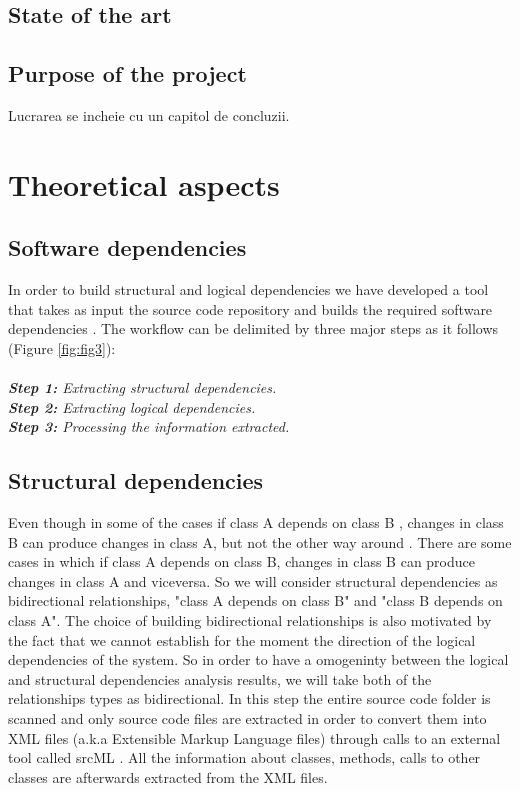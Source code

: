 \documentclass[12pt,a4paper,oneside]{report}
\begin{document}
\section {State of the art}

\section{Purpose of the project}
Lucrarea se incheie cu un capitol de concluzii.


\chapter{Theoretical aspects}

\section{Software dependencies}
In order to build structural and logical dependencies we have developed a tool that takes as input the source code repository and builds the required software dependencies . The workflow can be delimited by three major steps as it follows (Figure \ref{fig:fig3}):\\ \\
\textit{\textbf{Step 1:} Extracting structural dependencies.}\\
\textit{\textbf{Step 2:} Extracting logical dependencies.}\\
\textit{\textbf{Step 3:} Processing the information extracted.}

\section{Structural dependencies}
Even though in some of the cases if class A depends on class B , changes in class B can produce changes in class A, but not the other way around \cite{ct5} . There are some cases in which if class A depends on class B,  changes in class B can produce changes in class A and viceversa. So we will consider structural dependencies as bidirectional relationships, "class A depends on class B" and "class B depends on class A". The choice of building bidirectional relationships is also motivated by the fact that we cannot establish for the moment the direction of the logical dependencies of the system. So in order to have a omogeninty between the logical and structural dependencies analysis results, we will take both of the relationships types as bidirectional.
In this step the entire source code folder is scanned and only source code files are extracted in order to convert them into XML files (a.k.a  Extensible Markup Language files) through calls to an external tool called srcML \cite{ct9}. All the information about classes, methods, calls to other classes are afterwards extracted from the XML files.
\end{document}
